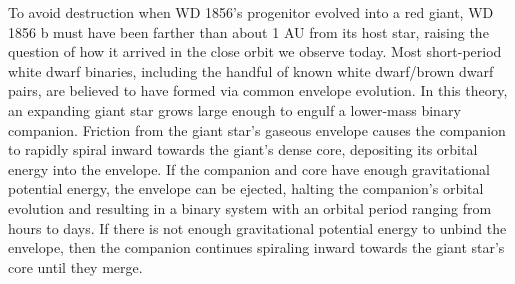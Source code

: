\documentclass{nature3}
\newcommand*{\bedit}{\textcolor{new_black}}
\begin{document}
To avoid destruction when WD 1856's progenitor evolved into a red giant, WD 1856 b must have been farther than about 1 AU from its host star, raising the question of how it arrived in the close orbit we observe today. 
Most short-period white dwarf binaries, including the handful of known white dwarf/brown dwarf pairs\cite{casewell2012, littlefair14, wd1202, parsons2017}, are believed to have formed via common envelope evolution\cite{Paczynski1976}. In this \bedit{theory}, an expanding giant star grows large enough to engulf a lower-mass binary companion. Friction from the giant star's gaseous envelope causes the companion to rapidly spiral inward towards the giant's dense core, depositing its orbital energy into the envelope. If the companion and core have enough gravitational potential energy, the envelope can be ejected, halting the companion's orbital evolution and resulting in a binary system with an orbital period ranging from hours to days. If there is not enough gravitational potential energy to unbind the envelope, then the companion continues spiraling inward towards the giant star's core until they merge. 
\end{document}
